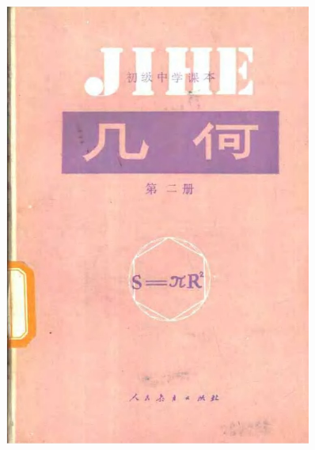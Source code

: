\begin{titlepage}
    \begin{figure}[htbp]
        \centering
        \includegraphics[width=0.9\textwidth]{../pic/czjh2-cover}
    \end{figure}

 \end{titlepage}
